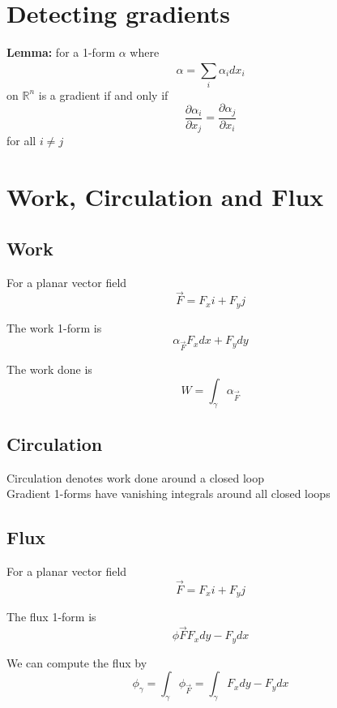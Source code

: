\section{Detecting gradients}

\begin{framed}
   \textbf{Lemma:} for a 1-form $\alpha$  where
   \[
      \alpha = \sum\limits_{i}^{} \alpha_i dx_i
   \]  on $ \mathbb{R}^n$  is a gradient if and only if 
   \[
     \frac{\partial \alpha_i}{\partial x_j} = \frac{\partial \alpha_j}{\partial x_i}
   \]  for all $i \neq j$
  
\end{framed}



\section{Work, Circulation and Flux}

\subsection{Work}
\begin{framed}
For a planar vector field
\[
   \vec{F} = F_x i + F_y j
\] 

The work 1-form is
\[
   \alpha_{\vec{F}} F_x dx + F_y dy
\] 

The work done is
\[
   W = \int_{\gamma} \alpha_{\vec{F}}
\] 
\end{framed}

\subsection{Circulation}
Circulation denotes work done around a closed loop \\

Gradient 1-forms have vanishing integrals around all closed loops


\subsection{Flux}

\begin{framed}

For a planar vector field
\[
   \vec{F} = F_x i + F_y j
\] 

The flux 1-form is
\[
   \phi{\vec{F}} F_x dy - F_y dx
\] 

We can compute the flux by
\[
   \phi_{\gamma} = \int_{\gamma} \phi_{\vec{F}} = \int_{\gamma} F_x dy - F_y dx
\] 

\end{framed}

